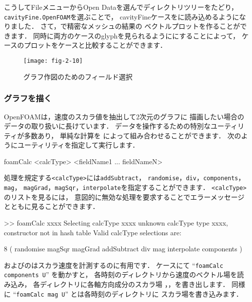 こうしてFileメニューからOpen Dataを選んでディレクトリツリーをたどり，\break
\texttt{cavityFine.OpenFOAM}を選ぶことで，
cavityFineケースをに読み込めるようになりました．
さて，で精密なメッシュの結果の
ベクトルプロットを作ることができます．
同時に両方のケースのglyphを見られるようににすることによって，
ケースのプロットをケースと比較することができます．


\begin{figure}[ht]
 \texttt{[image: fig-2-10]}
 \caption{グラフ作図のためのフィールド選択}
 \label{fig:2.10}
\end{figure}


\subsubsection{グラフを描く}
\label{sssec:2.1.5.7}
OpenFOAMは，速度のスカラ値を抽出して2次元のグラフに
描画したい場合のデータの取り扱いに長けています．
データを操作するための特別なユーティリティが多数あり，
単純な計算を
%
%
によって組み合わせることができます．
次のようにユーティリティを指定して実行します．
\begin{OFverbatim}[terminal]
foamCalc <calcType> <fieldName1 ... fieldNameN>
\end{OFverbatim}
処理を規定する\texttt{<calcType>}には\texttt{addSubtract}，
\texttt{randomise}，\texttt{div}，\texttt{components}，\texttt{mag}，
\texttt{magGrad}，\texttt{magSqr}，\texttt{interpolate}を指定することができます．
\texttt{<calcType>}のリストを見るには，
意図的に無効な処理を要求することでエラーメッセージとともに見ることができます．
\begin{OFverbatim}[baselinestretch=0.8, weight=\small]
>> foamCalc xxxx
Selecting calcType xxxx
unknown calcType type xxxx, constructor not in hash table
Valid calcType selections are:

8
(
randomise
magSqr
magGrad
addSubtract
div
mag
interpolate
components
)
\end{OFverbatim}

およびのはスカラ速度を計測するのに有用です．
ケースにて ``\texttt{foamCalc components U}'' を動かすと，
各時刻のディレクトリから速度のベクトル場を読み込み，
各ディレクトリに各軸方向成分のスカラ場
，，を書き出します．
同様に ``\texttt{foamCalc mag U}'' とは各時刻のディレクトリに
スカラ場を書き込みます．

